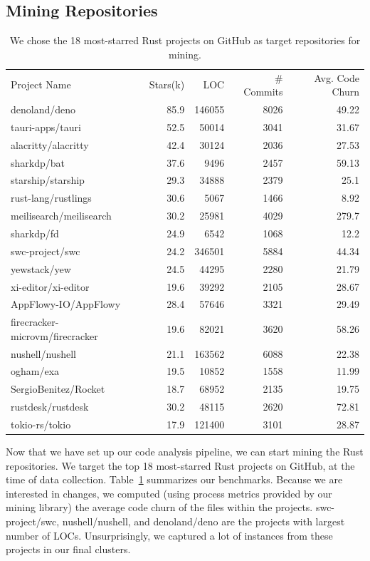 \subsection{\label{sec:mining_repositories}Mining Repositories}
\label{sec:mining}

\begin{table}
\caption{\label{table:repos} We chose the 18 most-starred Rust projects on GitHub as target repositories for mining.
}
\begin{tabular}{l r r r r}
    Project Name & Stars(k) & LOC & \# Commits & Avg. Code Churn \\
    denoland/deno & 85.9 & 146055 & 8026 & 49.22 \\
    tauri-apps/tauri & 52.5 & 50014 & 3041 & 31.67 \\
    alacritty/alacritty & 42.4 & 30124 & 2036 & 27.53 \\
    sharkdp/bat & 37.6 & 9496 & 2457 & 59.13 \\
    starship/starship & 29.3 & 34888 & 2379 & 25.1 \\
    rust-lang/rustlings & 30.6 & 5067 & 1466 & 8.92 \\
    meilisearch/meilisearch & 30.2 & 25981 & 4029 & 279.7 \\
    sharkdp/fd & 24.9 & 6542 & 1068 & 12.2 \\
    swc-project/swc & 24.2 & 346501 & 5884 & 44.34 \\
    yewstack/yew & 24.5 & 44295 & 2280 & 21.79 \\
    xi-editor/xi-editor & 19.6 & 39292 & 2105 & 28.67 \\
    AppFlowy-IO/AppFlowy & 28.4 & 57646 & 3321 & 29.49 \\
    firecracker-microvm/firecracker & 19.6 & 82021 & 3620 & 58.26 \\
    nushell/nushell & 21.1 & 163562 & 6088 & 22.38 \\
    ogham/exa & 19.5 & 10852 & 1558 & 11.99 \\
    SergioBenitez/Rocket & 18.7 & 68952 & 2135 & 19.75 \\
    rustdesk/rustdesk & 30.2 & 48115 & 2620 & 72.81 \\
    tokio-rs/tokio & 17.9 & 121400 & 3101 & 28.87 
\end{tabular}
\end{table}
   

Now that we have set up our code analysis pipeline, we can start mining the Rust repositories. We target the top 18 most-starred Rust projects on GitHub, at the time of data collection. Table~\ref{table:repos} summarizes our benchmarks. Because we are interested in changes, we computed (using process metrics provided by our mining library) the average code churn of the files within the projects. swc-project/swc, nushell/nushell, and denoland/deno are the projects with largest number of LOCs. Unsurprisingly, we captured a lot of instances from these projects in our final clusters.

